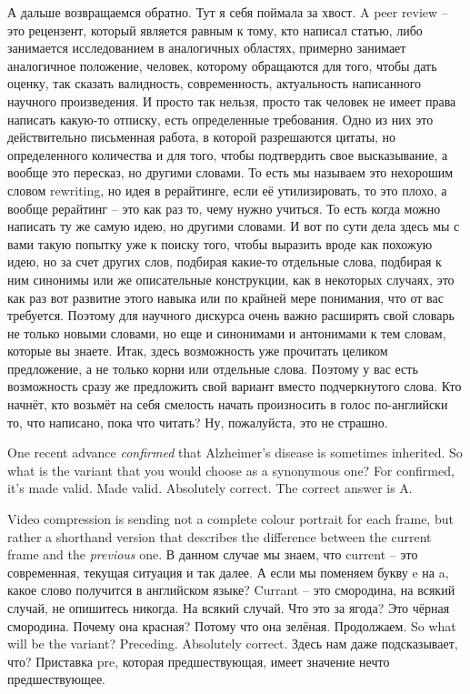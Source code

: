 \documentclass[main.tex]{subfiles}
\begin{document}
А дальше возвращаемся обратно.
Тут я себя поймала за хвост.
A peer review -- это рецензент, который является равным к тому, кто написал статью, либо занимается исследованием в аналогичных областях, примерно занимает аналогичное положение, человек, которому обращаются для того, чтобы дать оценку, так сказать валидность, современность, актуальность написанного научного произведения.
И просто так нельзя, просто так человек не имеет права написать какую-то отписку, есть определенные требования.
Одно из них это действительно письменная работа, в которой разрешаются цитаты, но определенного количества и для того, чтобы подтвердить свое высказывание, а вообще это пересказ, но другими словами.
То есть мы называем это нехорошим словом rewriting, но идея в рерайтинге, если её утилизировать, то это плохо, а вообще рерайтинг -- это как раз то, чему нужно учиться.
То есть когда можно написать ту же самую идею, но другими словами.
И вот по сути дела здесь мы с вами такую попытку уже к поиску того, чтобы выразить вроде как похожую идею, но за счет других слов, подбирая какие-то отдельные слова, подбирая к ним синонимы или же описательные конструкции, как в некоторых случаях, это как раз вот развитие этого навыка или по крайней мере понимания, что от вас требуется.
Поэтому для научного дискурса очень важно расширять свой словарь не только новыми словами, но еще и синонимами и антонимами к тем словам, которые вы знаете.
Итак, здесь возможность уже прочитать целиком предложение, а не только корни или отдельные слова.
Поэтому у вас есть возможность сразу же предложить свой вариант вместо подчеркнутого слова.
Кто начнёт, кто возьмёт на себя смелость начать произносить в голос по-английски то, что написано, пока что читать?
Ну, пожалуйста, это не страшно.

One recent advance \textit{confirmed} that Alzheimer's disease is sometimes inherited.
So what is the variant that you would choose as a synonymous one?
For confirmed, it's made valid.
Made valid.
Absolutely correct.
The correct answer is A.

Video compression is sending not a complete colour portrait for each frame, but rather a shorthand version that describes the difference between the current frame and the \textit{previous} one.
В данном случае мы знаем, что current -- это современная, текущая ситуация и так далее.
А если мы поменяем букву e на a, какое слово получится в английском языке? 
Currant -- это смородина, на всякий случай, не опишитесь никогда.
На всякий случай.
Что это за ягода? Это чёрная смородина.
Почему она красная? Потому что она зелёная.
Продолжаем.
So what will be the variant?
Preceding.
Absolutely correct.
Здесь нам даже подсказывает, что?
Приставка pre, которая предшествующая, имеет значение нечто предшествующее.
\end{document}
